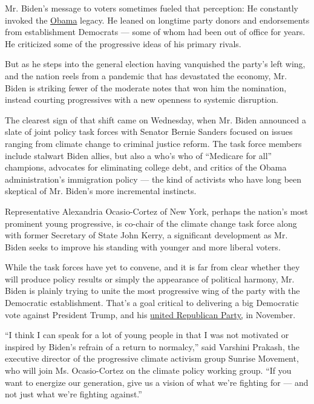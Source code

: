 Mr. Biden's message to voters sometimes fueled that perception: He
constantly invoked the
\href{https://www.nytimes3xbfgragh.onion/2020/05/14/us/politics/trump-obama.html}{Obama}
legacy. He leaned on longtime party donors and endorsements from
establishment Democrats --- some of whom had been out of office for
years. He criticized some of the progressive ideas of his primary
rivals.

But as he steps into the general election having vanquished the party's
left wing, and the nation reels from a pandemic that has devastated the
economy, Mr. Biden is striking fewer of the moderate notes that won him
the nomination, instead courting progressives with a new openness to
systemic disruption.

The clearest sign of that shift came on Wednesday, when Mr. Biden
announced a slate of joint policy task forces with Senator Bernie
Sanders focused on issues ranging from climate change to criminal
justice reform. The task force members include stalwart Biden allies,
but also a who's who of ``Medicare for all'' champions, advocates for
eliminating college debt, and critics of the Obama administration's
immigration policy --- the kind of activists who have long been
skeptical of Mr. Biden's more incremental instincts.

Representative Alexandria Ocasio-Cortez of New York, perhaps the
nation's most prominent young progressive, is co-chair of the climate
change task force along with former Secretary of State John Kerry, a
significant development as Mr. Biden seeks to improve his standing with
younger and more liberal voters.

While the task forces have yet to convene, and it is far from clear
whether they will produce policy results or simply the appearance of
political harmony, Mr. Biden is plainly trying to unite the most
progressive wing of the party with the Democratic establishment. That's
a goal critical to delivering a big Democratic vote against President
Trump, and his
\href{https://news.gallup.com/interactives/185273/r.aspx}{united
Republican Party,} in November.

``I think I can speak for a lot of young people in that I was not
motivated or inspired by Biden's refrain of a return to normalcy,'' said
Varshini Prakash, the executive director of the progressive climate
activism group Sunrise Movement, who will join Ms. Ocasio-Cortez on the
climate policy working group. ``If you want to energize our generation,
give us a vision of what we're fighting for --- and not just what we're
fighting against.''

